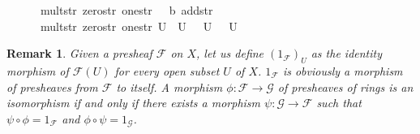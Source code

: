 \documentclass[12pt]{scrartcl}
\newtheorem{remark}[proposition]{Remark}
\begin{document}
\begin{isabelle}
\ \ \ \ \ \ mult{\isacharunderscore}{\kern0pt}str\ zero{\isacharunderscore}{\kern0pt}str\ one{\isacharunderscore}{\kern0pt}str\ {\isasymFF}{\isacharprime}{\kern0pt}{\isacharprime}{\kern0pt}\ {\isasymrho}{\isacharprime}{\kern0pt}{\isacharprime}{\kern0pt}\ b{\isacharprime}{\kern0pt}{\isacharprime}{\kern0pt}\ add{\isacharunderscore}{\kern0pt}str{\isacharprime}{\kern0pt}{\isacharprime}{\kern0pt}\ \isanewline
\ \ \ \ \ \ mult{\isacharunderscore}{\kern0pt}str{\isacharprime}{\kern0pt}{\isacharprime}{\kern0pt}\ zero{\isacharunderscore}{\kern0pt}str{\isacharprime}{\kern0pt}{\isacharprime}{\kern0pt}\ one{\isacharunderscore}{\kern0pt}str{\isacharprime}{\kern0pt}{\isacharprime}{\kern0pt}\ {\isacharparenleft}{\kern0pt}{\isasymlambda}U{\isachardot}{\kern0pt}\ {\isacharparenleft}{\kern0pt}{\isasymphi}{\isacharprime}{\kern0pt}\ U\ {\isasymcirc}\ {\isasymphi}\ U\ {\isasymdown}\ {\isasymFF}\ U{\isacharparenright}{\kern0pt}{\isacharparenright}{\kern0pt}{\isachardoublequoteclose}
\end{isabelle}

\begin{remark}
	Given a presheaf $\mathscr{F}$ on $X$, let us define $(1_{\mathscr{F}})_U$ as the identity morphism of $\mathscr{F}(U)$ for every open subset $U$ of $X$. $1_{\mathscr{F}}$ is obviously a morphism of presheaves from $\mathscr{F}$ to itself. A morphism $\phi: \mathscr{F} \rightarrow \mathscr{G}$ of presheaves of rings is an isomorphism if and only if there exists a morphism $\psi: \mathscr{G} \rightarrow \mathscr{F}$ such that $\psi \circ \phi = 1_{\mathscr{F}}$ and $\phi \circ \psi = 1_{\mathscr{G}}$.  
\end{remark}
\end{document}
